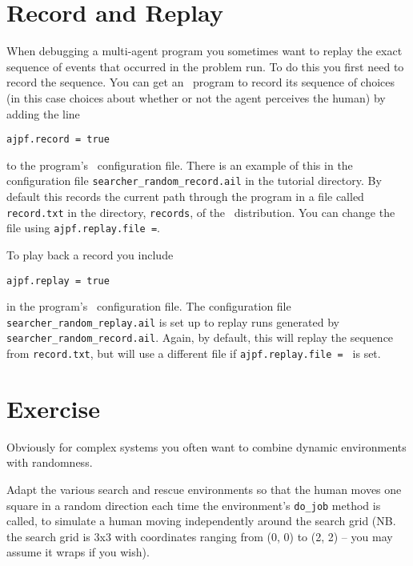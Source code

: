 \section{Record and Replay}
When debugging a multi-agent program you sometimes want to replay the exact sequence of events that occurred in the  problem run.  To do this you first need to record the sequence.  You can get an \ail\ program to record its sequence of choices (in this case choices about whether or not the agent perceives the human) by adding the line

\begin{verbatim}
ajpf.record = true
\end{verbatim}
\begin{sloppypar}
\noindent to the program's \ail\ configuration file.  There is an example of this in the configuration file \texttt{searcher\_random\_record.ail} in the tutorial directory.  By default this records the current path through the program in a file called \texttt{record.txt} in the directory, \texttt{records}, of the \mcapl\ distribution.  You can change the file using \texttt{ajpf.replay.file =}.  
\end{sloppypar}

To play back a record you include
\begin{verbatim}
ajpf.replay = true
\end{verbatim}
\begin{sloppypar}
\noindent in the program's \ail\ configuration file.  The configuration file \texttt{searcher\_random\_replay.ail} is set up to replay runs generated by \texttt{searcher\_random\_record.ail}.  Again, by default, this will replay the sequence from \texttt{record.txt}, but will use a different file if \texttt{ajpf.replay.file = } is set.  
\end{sloppypar}

\section{Exercise}

Obviously for complex systems you often want to combine dynamic environments with randomness.  

Adapt the various search and rescue environments so that the human moves one square in a random direction each time the environment's \texttt{do\_job} method is called, to simulate a human moving independently around the search grid (NB. the search grid is 3x3 with coordinates ranging from (0, 0) to (2, 2) -- you may assume it wraps if you wish).  

